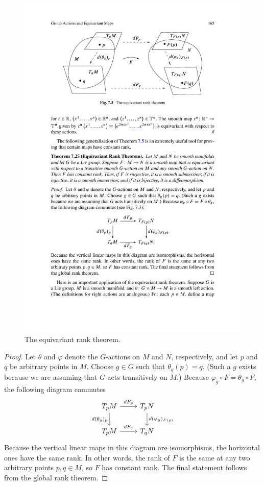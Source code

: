 \begin{figure}[htbp]
\centering
\includegraphics{pictures/equivariant-rank}
\caption{The equivariant rank theorem.}
\end{figure}
\begin{proof}
Let $\theta$ and $\varphi$ denote the $G$-actions on $M$ and $N$, respectively, and let $p$ and $q$ be arbitrary points in $M$. Choose $g\in G$ such that $\theta_g(p)=q$. (Such a $g$ exists because we are assuming that $G$ acts transitively on $M$.) Because $\varphi_g\circ F=\theta_g\circ F$, the following diagram commutes
\[\begin{tikzcd}
T_pM\ar[r,"dF_p"]\ar[d,swap,"d(\theta_g)_p"]&T_pN\ar[d,"d(\varphi_g)_{F(p)}"]\\
T_pM\ar[r,"dF_q"]&T_qN
\end{tikzcd}\]
Because the vertical linear maps in this diagram are isomorphisms, the horizontal ones have the same rank. In other words, the rank of $F$ is the same at any two arbitrary points $p,q\in M$, so $F$ has constant rank. The final statement follows from the global rank theorem.
\end{proof}
